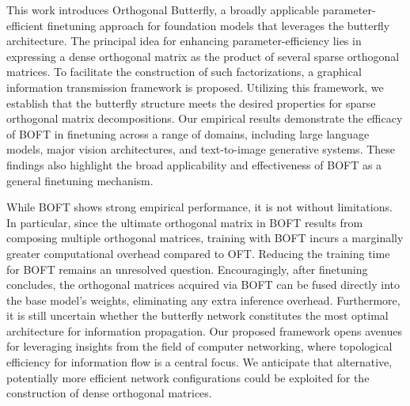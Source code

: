 This work introduces Orthogonal Butterfly, a broadly applicable parameter-efficient finetuning approach for foundation models that leverages the butterfly architecture. The principal idea for enhancing parameter-efficiency lies in expressing a dense orthogonal matrix as the product of several sparse orthogonal matrices. To facilitate the construction of such factorizations, a graphical information transmission framework is proposed. Utilizing this framework, we establish that the butterfly structure meets the desired properties for sparse orthogonal matrix decompositions. Our empirical results demonstrate the efficacy of BOFT in finetuning across a range of domains, including large language models, major vision architectures, and text-to-image generative systems. These findings also highlight the broad applicability and effectiveness of BOFT as a general finetuning mechanism.

While BOFT shows strong empirical performance, it is not without limitations. In particular, since the ultimate orthogonal matrix in BOFT results from composing multiple orthogonal matrices, training with BOFT incurs a marginally greater computational overhead compared to OFT. Reducing the training time for BOFT remains an unresolved question. Encouragingly, after finetuning concludes, the orthogonal matrices acquired via BOFT can be fused directly into the base model’s weights, eliminating any extra inference overhead. Furthermore, it is still uncertain whether the butterfly network constitutes the most optimal architecture for information propagation. Our proposed framework opens avenues for leveraging insights from the field of computer networking, where topological efficiency for information flow is a central focus. We anticipate that alternative, potentially more efficient network configurations could be exploited for the construction of dense orthogonal matrices.

